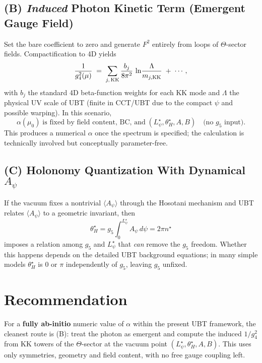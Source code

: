 \documentclass[12pt]{article}
\begin{document}
\subsection*{(B) \emph{Induced} Photon Kinetic Term (Emergent Gauge Field)}
Set the bare coefficient to zero and generate $F^2$ entirely from loops of $\Theta$-sector fields. Compactification to 4D yields
\begin{equation}
\frac{1}{g_4^2(\mu)} \;=\; \sum_{j,\,\text{KK}} \frac{b_j}{8\pi^2}\, \ln\!\frac{\Lambda}{m_{j,{\rm KK}}}
\;+\; \cdots ,
\end{equation}
with $b_j$ the standard 4D beta-function weights for each KK mode and $\Lambda$ the physical UV scale of UBT (finite in CCT/UBT due to the compact $\psi$ and possible warping). In this scenario,
\begin{equation}
\alpha(\mu_0) \;\text{is fixed by field content, BC, and}\; (L_\psi^\star,\theta_H^\star,A,B)
\quad \text{(no $g_5$ input)}.
\end{equation}
This produces a numerical $\alpha$ once the spectrum is specified; the calculation is technically involved but conceptually parameter-free.

\subsection*{(C) Holonomy Quantization With Dynamical $A_\psi$}
If the vacuum fixes a nontrivial $\langle A_\psi\rangle$ through the Hosotani mechanism and UBT relates $\langle A_\psi\rangle$ to a geometric invariant, then
\begin{equation}
\theta_H^\star = g_5 \int_0^{L_\psi^\star}\!\! A_\psi\, d\psi = 2\pi n^\star
\end{equation}
imposes a relation among $g_5$ and $L_\psi^\star$ that \emph{can} remove the $g_5$ freedom. Whether this happens depends on the detailed UBT background equations; in many simple models $\theta_H^\star$ is $0$ or $\pi$ independently of $g_5$, leaving $g_5$ unfixed.

\section{Recommendation}
For a \textbf{fully ab-initio} numeric value of $\alpha$ within the present UBT framework, the cleanest route is (B): treat the photon as emergent and compute the induced $1/g_4^2$ from KK towers of the $\Theta$-sector at the vacuum point $(L_\psi^\star,\theta_H^\star,A,B)$. This uses only symmetries, geometry and field content, with no free gauge coupling left.
\end{document}
